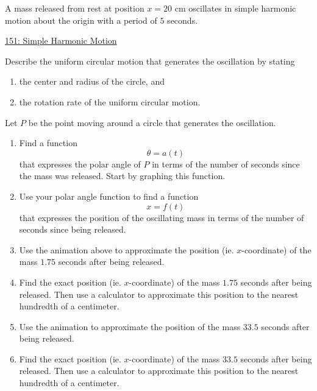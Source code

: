 \documentclass{ximera}
\begin{document}
\begin{example} \label{ExODferre3}
A mass released from rest at position $x=20$ cm oscillates in simple harmonic motion about the origin with a period of $5$ seconds.

\begin{onlineOnly}
    \begin{center}
\end{center}
\end{onlineOnly}

\href{https://www.desmos.com/calculator/dcba538898}{151: Simple Harmonic Motion}

\item Describe the uniform circular motion that generates the oscillation by stating
\begin{enumerate}
\item the center and radius of the circle, and

\item the rotation rate of the uniform circular motion. 
\end{enumerate}

\item Let $P$ be the point moving around a circle that generates the oscillation. 

\begin{enumerate}
\item Find a function
\[
    \theta = a(t)
\]
that expresses the polar angle of $P$ in terms of the number of seconds since the mass was released. Start by graphing this function. 

\item Use your polar angle function to find a function 
\[
   x= f(t)
\]
that expresses the position of the oscillating mass in terms of the number of seconds since being released.

\item Use the animation above to approximate  the position (ie. $x$-coordinate) of the mass $1.75$ seconds after being released.

\item Find the exact position (ie. $x$-coordinate) of the mass $1.75$ seconds after being released. Then use a calculator to approximate this position to the nearest hundredth of a centimeter.

\item Use the animation to approximate the position of the mass $33.5$ seconds after being released. 

\item Find the exact position (ie. $x$-coordinate) of the mass $33.5$ seconds after being released. Then use a calculator to approximate this position to the nearest hundredth of a centimeter.

\end{enumerate}

\end{example}
\end{document}
